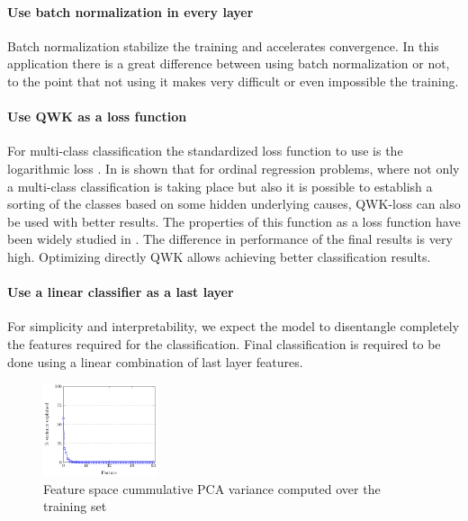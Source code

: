 \documentclass[preprint]{elsarticle}
\theoremstyle{definition} %
\theoremstyle{remark}
\begin{document}
\paragraph{Use batch normalization in every layer} Batch normalization \cite{batch-norm} stabilize the training and accelerates convergence. In this application there is a great difference between using batch normalization or not, to the point that not using it makes very difficult or even impossible the training.

\paragraph{Use QWK as a loss function} For multi-class classification the standardized loss function to use is the logarithmic loss \cite{Goodfellow-et-al-2016}. In \cite{DELATORRE2017} is shown that for ordinal regression problems, where not only a multi-class classification is taking place but also it is possible to establish a sorting of the classes based on some hidden underlying causes, QWK-loss can also be used with better results. The properties of this function as a loss function have been widely studied in \cite{jdelatorre-2017}. The difference in performance of the final results is very high. Optimizing directly QWK allows achieving better classification results.

\paragraph{Use a linear classifier as a last layer} For simplicity and interpretability, we expect the model to disentangle completely the features required for the classification. Final classification is required to be done using a linear combination of last layer features.

\begin{figure}
	\centering
	\includegraphics[width=0.30\textwidth]{figures/PCA-feature-space.pdf}
	\caption{Feature space cummulative PCA variance computed over the training set}
	\label{fig:pca_graph}
\end{figure}
\end{document}
